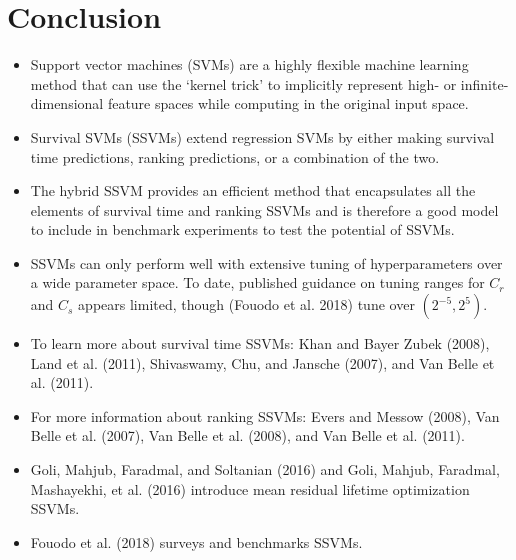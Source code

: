 \documentclass[
  letterpaper,
  krantz2]{style/krantz}
\providecommand{\tightlist}{%
  \setlength{\itemsep}{0pt}\setlength{\parskip}{0pt}}
\begin{document}
\section{Conclusion}\label{conclusion-10}

\begin{tcolorbox}[enhanced jigsaw, toprule=.15mm, bottomtitle=1mm, opacityback=0, breakable, leftrule=.75mm, title={Key takeaways}, toptitle=1mm, bottomrule=.15mm, colback=white, colframe=quarto-callout-warning-color-frame, titlerule=0mm, opacitybacktitle=0.6, coltitle=black, rightrule=.15mm, left=2mm, colbacktitle=quarto-callout-warning-color!10!white, arc=.35mm]

\begin{itemize}
\tightlist
\item
  Support vector machines (SVMs) are a highly flexible machine learning
  method that can use the `kernel trick' to implicitly represent high-
  or infinite-dimensional feature spaces while computing in the original
  input space.
\item
  Survival SVMs (SSVMs) extend regression SVMs by either making survival
  time predictions, ranking predictions, or a combination of the two.
\item
  The hybrid SSVM provides an efficient method that encapsulates all the
  elements of survival time and ranking SSVMs and is therefore a good
  model to include in benchmark experiments to test the potential of
  SSVMs.
\item
  SSVMs can only perform well with extensive tuning of hyperparameters
  over a wide parameter space. To date, published guidance on tuning
  ranges for \(C_r\) and \(C_s\) appears limited, though (Fouodo et al.
  2018) tune over \((2^{-5}, 2^5)\).
\end{itemize}

\end{tcolorbox}

\begin{tcolorbox}[enhanced jigsaw, toprule=.15mm, bottomtitle=1mm, opacityback=0, breakable, leftrule=.75mm, title={Further reading}, toptitle=1mm, bottomrule=.15mm, colback=white, colframe=quarto-callout-tip-color-frame, titlerule=0mm, opacitybacktitle=0.6, coltitle=black, rightrule=.15mm, left=2mm, colbacktitle=quarto-callout-tip-color!10!white, arc=.35mm]

\begin{itemize}
\tightlist
\item
  To learn more about survival time SSVMs: Khan and Bayer Zubek (2008),
  Land et al. (2011), Shivaswamy, Chu, and Jansche (2007), and Van Belle
  et al. (2011).
\item
  For more information about ranking SSVMs: Evers and Messow (2008), Van
  Belle et al. (2007), Van Belle et al. (2008), and Van Belle et al.
  (2011).
\item
  Goli, Mahjub, Faradmal, and Soltanian (2016) and Goli, Mahjub,
  Faradmal, Mashayekhi, et al. (2016) introduce mean residual lifetime
  optimization SSVMs.
\item
  Fouodo et al. (2018) surveys and benchmarks SSVMs.
\end{itemize}

\end{tcolorbox}
\end{document}
